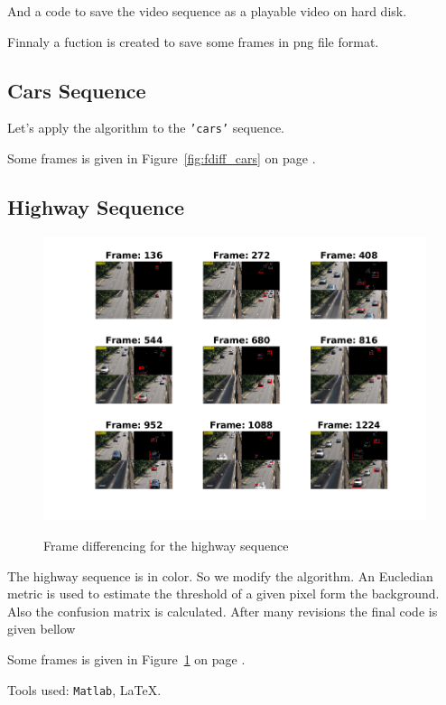 \documentclass[a4paper,12pt]{article}
\begin{document}


And a code to save the video sequence as a playable video on hard disk.



Finnaly a fuction is created to save some frames in png file format.


\subsection{Cars Sequence}
Let's apply the algorithm to the \texttt{'cars'} sequence.


Some frames is given in Figure~\ref{fig:fdiff_cars} on page \pageref{fig:fdiff_cars}.


\subsection{Highway Sequence}

\begin{figure}[Ht]
\centering
\includegraphics{../Videos/highway_frame_diff.png}
\label{fig:fdiff_highway}
\caption{Frame differencing for the highway sequence}
\end{figure}

The highway sequence is in color. So we modify the algorithm. An Eucledian metric is used  to estimate the threshold of a given pixel form the background. Also the confusion matrix is calculated. After many revisions the final code is given bellow



Some frames is given in Figure~\ref{fig:fdiff_highway} on page \pageref{fig:fdiff_highway}.



\vfill
\noindent Tools used: \texttt{Matlab}, \LaTeX{}.
\end{document}
